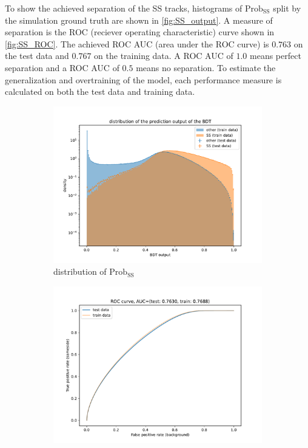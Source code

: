 To show the achieved separation of the SS tracks, histograms of $\text{Prob}_\text{SS}$ split by the simulation ground truth are shown in \autoref{fig:SS_output}.
A measure of separation is the ROC (reciever operating characteristic) curve shown in \autoref{fig:SS_ROC}.
The achieved ROC AUC (area under the ROC curve) is $0.763$ on the test data and $0.767$ on the training data.
A ROC AUC of $1.0$ means perfect separation and a ROC AUC of $0.5$ means no separation.
To estimate the generalization and overtraining of the model, each performance measure is calculated on both the test data and training data.

\begin{figure}
    \centering
    \begin{subfigure}{0.5\textwidth}
        \centering
        \includegraphics[width=\textwidth]{images/SS_output.pdf}
        \caption{distribution of $\text{Prob}_\text{SS}$}
        \label{fig:SS_output}
    \end{subfigure}%
    \begin{subfigure}{0.5\textwidth}
        \centering
        \includegraphics[width=\textwidth]{images/SS_ROC.pdf}

\end{subfigure}
\end{figure}
